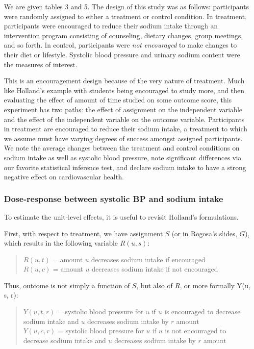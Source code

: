 \documentclass{article}
\begin{document}
We are given tables 3 and 5.  The design of this study was as follows: participants were randomly assigned to either a treatment or control condition.  In treatment, participants were encouraged to reduce their sodium intake through an intervention program consisting  of counseling, dietary changes, group meetings, and so forth.  In control, participants were \emph{not encouraged} to make changes to their diet or lifestyle.  Systolic blood pressure and urinary sodium content were the measures of interest.

This is an encouragement design because of the very nature of treatment.  Much like Holland's example with students being encouraged to study more, and then evaluating the effect of amount of time studied on some outcome score, this experiment has two paths: the effect of assignment on the independent variable and the effect of the independent variable on the outcome variable.  Participants in treatment are encouraged to reduce their sodium intake, a treatment to which we assume must have varying degrees of success amongst assigned participants.  We note the average changes between the treatment and control conditions on sodium intake as well as systolic blood pressure, note significant differences via our favorite statistical inference test, and declare sodium intake to have a strong negative effect on cardiovascular health.

\subsubsection{Dose-response between systolic BP and sodium intake}

To estimate the unit-level effects, it is useful to revisit Holland's formulations.

First, with respect to treatment, we have assignment $S$ (or in Rogosa's slides, $G$), which results in the following variable $R(u, s)$:

\begin{quote}
$R(u, t)$ = amount $u$ decreases sodium intake if encouraged\\
$R(u, c)$ = amount $u$ decreases sodium intake if not encouraged
\end{quote}

Thus, outcome is not simply a function of $S$, but also of $R$, or more formally Y(u, s, r):

\begin{quote}
$Y(u, t, r)$ = systolic blood pressure for $u$ if $u$ is encouraged to decrease sodium intake and $u$ decreases sodium intake by $r$ amount\\
$Y(u, c, r)$ = systolic blood pressure for $u$ if $u$ is not encouraged to decrease sodium intake and $u$ decreases sodium intake by $r$ amount
\end{quote}
\end{document}
